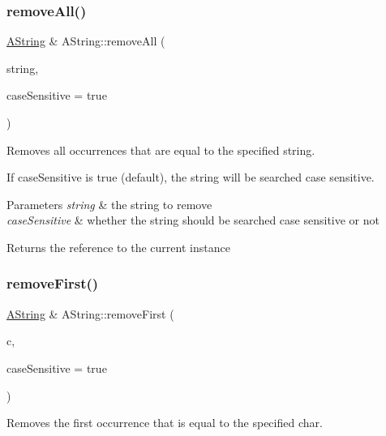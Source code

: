 \subsubsection{\texorpdfstring{removeAll()}{removeAll()}\hspace{0.1cm}{\footnotesize\ttfamily [2/2]}}
{\footnotesize\ttfamily \mbox{\hyperlink{class_a_string}{A\+String}} \& A\+String\+::remove\+All (\begin{DoxyParamCaption}\item[{const \mbox{\hyperlink{class_a_string}{A\+String}} \&}]{string,  }\item[{bool}]{case\+Sensitive = {\ttfamily true} }\end{DoxyParamCaption})}



Removes all occurrences that are equal to the specified string. 

If case\+Sensitive is true (default), the string will be searched case sensitive.


\begin{DoxyParams}{Parameters}
{\em string} & the string to remove \\
\hline
{\em case\+Sensitive} & whether the string should be searched case sensitive or not \\
\hline
\end{DoxyParams}
\begin{DoxyReturn}{Returns}
the reference to the current instance 
\end{DoxyReturn}
\mbox{\label{class_a_string_a5fe11f844aa85e053fbf0bedc18cd557}} 
\subsubsection{\texorpdfstring{removeFirst()}{removeFirst()}\hspace{0.1cm}{\footnotesize\ttfamily [1/2]}}
{\footnotesize\ttfamily \mbox{\hyperlink{class_a_string}{A\+String}} \& A\+String\+::remove\+First (\begin{DoxyParamCaption}\item[{char}]{c,  }\item[{bool}]{case\+Sensitive = {\ttfamily true} }\end{DoxyParamCaption})}



Removes the first occurrence that is equal to the specified char. 


